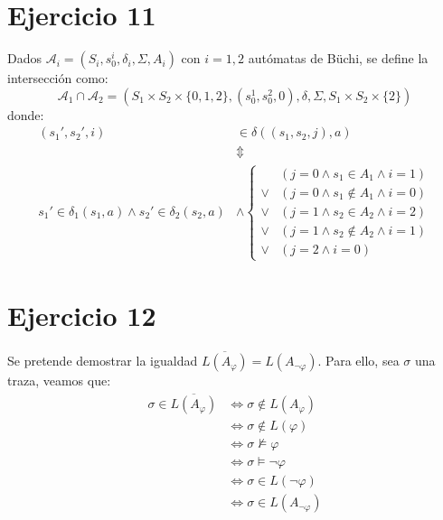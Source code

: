 \documentclass{article}
\begin{document}
\section*{Ejercicio 11}
Dados $\mathcal{A}_i = (S_i, s_0^i, \delta_i, \Sigma, A_i)$ con $i = 1, 2$ autómatas de Büchi, se define la intersección como:
\begin{equation*}
	\mathcal{A}_1 \cap \mathcal{A}_2 = (S_1 \times S_2 \times \{0, 1, 2\}, (s_0^1, s_0^2, 0), \delta, \Sigma, S_1 \times S_2 \times \{2\})
\end{equation*}
donde:
\begin{equation*}
	\begin{aligned}
		(s_1', s_2', i)                                           & \in \delta((s_1, s_2, j), a)                          \\
		                                                          & \Updownarrow                                          \\
		s_1' \in \delta_1(s_1, a) \land s_2' \in \delta_2(s_2, a) & \land \begin{cases}
			                                                                       & (j = 0 \land s_1 \in A_1 \land i = 1)    \\
			                                                                  \lor & (j = 0 \land s_1 \notin A_1 \land i = 0) \\
			                                                                  \lor & (j = 1 \land s_2 \in A_2 \land i = 2)    \\
			                                                                  \lor & (j = 1 \land s_2 \notin A_2 \land i = 1) \\
			                                                                  \lor & (j = 2 \land i = 0)
		                                                                  \end{cases}
	\end{aligned}
\end{equation*}

\section*{Ejercicio 12}
Se pretende demostrar la igualdad $\overline{L(A_\varphi)} = L(A_{\neg\varphi})$.
Para ello, sea $\sigma$ una traza, veamos que:
\begin{equation*}
	\begin{aligned}
		\sigma \in \overline{L(A_\varphi)} & \iff \sigma \notin L(A_\varphi)    \\
		                                   & \iff \sigma \notin L(\varphi)      \\
		                                   & \iff \sigma \not\vDash \varphi     \\
		                                   & \iff \sigma \vDash \neg\varphi     \\
		                                   & \iff \sigma \in L(\neg\varphi)     \\
		                                   & \iff \sigma \in L(A_{\neg\varphi})
	\end{aligned}
\end{equation*}
\end{document}
